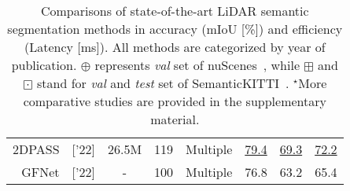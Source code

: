 \begin{table}[h]
{\begin{tabular}{ r|c|c|c|c|c|c}
    2DPASS~\cite{yan20222dpass}~\small{['22]} &  26.5M & 119& Multiple & \underline{79.4} & \underline{69.3} & \underline{72.2}\\
     GFNet~\cite{qiu2022gfnet}~\small{['22]} &  - & 100& Multiple & 76.8 & 63.2 & 65.4
    \\\bottomrule
    \end{tabular}
    }
    \vspace{-0.2mm}
    \caption{Comparisons of state-of-the-art LiDAR semantic segmentation methods in accuracy (mIoU [\%]) and efficiency (Latency [ms]). All methods are categorized by year of publication. $\oplus$ represents \textit{val} set of nuScenes~\cite{caesar2020nuscenes}, while $\boxplus$ and $\boxdot$ stand for \textit{val} and \textit{test} set of SemanticKITTI~\cite{behley2019semantickitti}. $^\star$More comparative studies are provided in the supplementary material.}
    \vspace{-4mm}
    \label{tab:SOTA}
\end{table}
